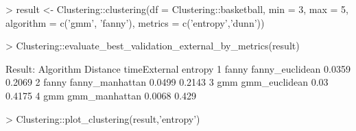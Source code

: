 \documentclass{article}
\begin{document}



\begin{Schunk}
\begin{Sinput}
> result <- Clustering::clustering(df = Clustering::basketball, min = 3, max = 5, algorithm = c('gmm', 'fanny'), metrics = c('entropy','dunn'))
\end{Sinput}
\end{Schunk}

\begin{Schunk}
\begin{Sinput}
> Clustering::evaluate_best_validation_external_by_metrics(result)
\end{Sinput}
\begin{Soutput}
Result:	
  Algorithm        Distance timeExternal entropy
1     fanny fanny_euclidean       0.0359  0.2069
2     fanny fanny_manhattan       0.0499  0.2143
3       gmm   gmm_euclidean         0.03  0.4175
4       gmm   gmm_manhattan       0.0068   0.429
\end{Soutput}
\end{Schunk}

\begin{Schunk}
\begin{Sinput}
> Clustering::plot_clustering(result,'entropy')
\end{Sinput}
\end{Schunk}
\end{document}
